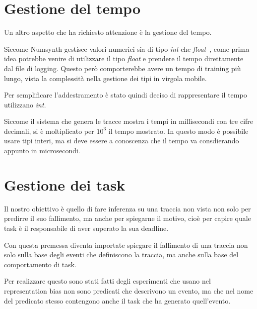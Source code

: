 \section{Gestione del tempo}
Un altro aspetto che ha richiesto attenzione è la gestione del tempo.

Siccome Numsynth gestisce valori numerici sia di tipo \textit{int} che \textit{float}~\cite{numsynth}, come prima idea potrebbe venire di utilizzare il tipo \textit{float} e prendere il tempo direttamente dal file di logging. Questo però comporterebbe avere un tempo di training più lungo, vista la complessità nella gestione dei tipi in virgola mobile.

\myskip

Per semplificare l'addestramento è stato quindi deciso di rappresentare il tempo utilizzano \textit{int}.

Siccome il sistema che genera le tracce mostra i tempi in millisecondi con tre cifre decimali, si è moltiplicato per $10^3$ il tempo mostrato. In questo modo è possibile usare tipi interi, ma si deve essere a conoscenza che il tempo va consdierando appunto in microsecondi.

\section{Gestione dei task}
\label{sec:gestione-task}
Il nostro obiettivo è quello di fare inferenza su una traccia non vista non solo per predirre il suo fallimento, ma anche per spiegarne il motivo, cioè per capire quale task è il responsabile di aver superato la sua deadline.

Con questa premessa diventa importate spiegare il fallimento di una traccia non solo sulla base degli eventi che definiscono la traccia, ma anche sulla base del comportamento di task.

Per realizzare questo sono stati fatti degli esperimenti che usano nel representation bias non sono predicati che descrivono un evento, ma che nel nome del predicato stesso contengono anche il task che ha generato quell'evento.